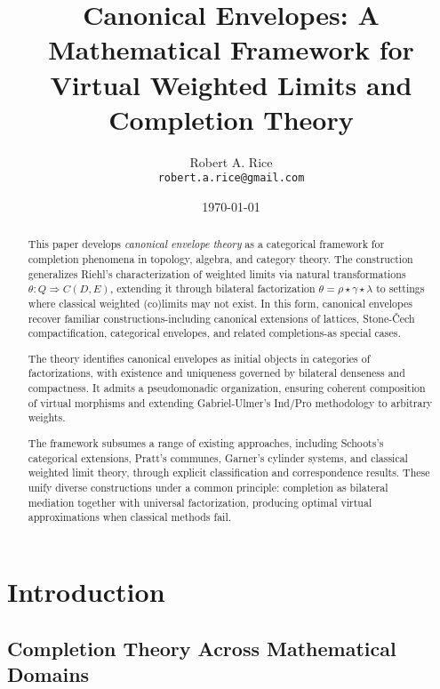 \documentclass[11pt]{article}
\title{Canonical Envelopes: A Mathematical Framework for Virtual Weighted Limits and Completion Theory}
\author{Robert A. Rice\\
\texttt{robert.a.rice@gmail.com}}
\date{\today}
\theoremstyle{plain}
\theoremstyle{definition}
\theoremstyle{remark}
\begin{document}
\maketitle

\begin{abstract}
This paper develops \emph{canonical envelope theory} as a categorical framework for completion phenomena in topology, algebra, and category theory.  
The construction generalizes Riehl's characterization of weighted limits via natural transformations $\theta : Q \Rightarrow C(D,E)$, extending it through bilateral factorization $\theta = \rho \star \gamma \star \lambda$ to settings where classical weighted (co)limits may not exist.  
In this form, canonical envelopes recover familiar constructions-including canonical extensions of lattices, Stone-\v{C}ech compactification, categorical envelopes, and related completions-as special cases.

The theory identifies canonical envelopes as initial objects in categories of factorizations, with existence and uniqueness governed by bilateral denseness and compactness.  It admits a pseudomonadic organization, ensuring coherent composition of virtual morphisms and extending Gabriel-Ulmer's Ind/Pro methodology to arbitrary weights.

The framework subsumes a range of existing approaches, including Schoots's categorical extensions, Pratt's communes, Garner's cylinder systems, and classical weighted limit theory, through explicit classification and correspondence results. These unify diverse constructions under a common principle: completion as bilateral mediation together with universal factorization, producing optimal virtual approximations when classical methods fail.
\end{abstract}

\section{Introduction}

\subsection{Completion Theory Across Mathematical Domains}
\end{document}
